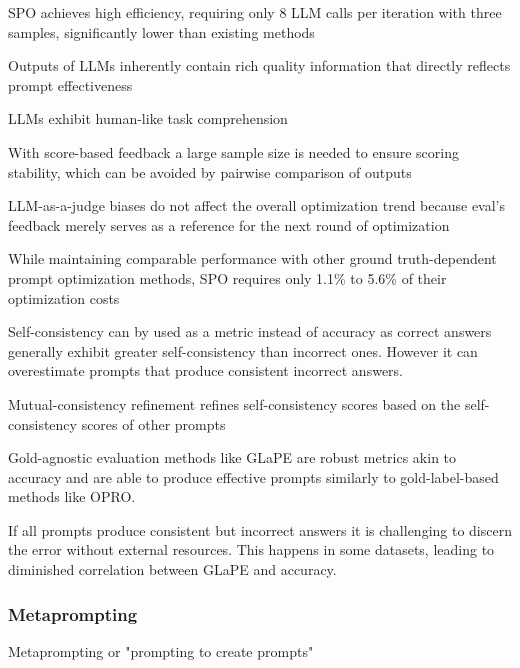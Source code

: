 SPO achieves high efficiency, requiring only 8 LLM calls per iteration with three samples, significantly lower than existing methods \cite{xiang2025selfsupervisedpromptoptimization}

Outputs of LLMs inherently contain rich quality information that directly reflects prompt effectiveness \cite{xiang2025selfsupervisedpromptoptimization}

LLMs exhibit human-like task comprehension \cite{xiang2025selfsupervisedpromptoptimization}

With score-based feedback a large sample size is needed to ensure scoring stability, which can be avoided by pairwise comparison of outputs \cite{xiang2025selfsupervisedpromptoptimization}

LLM-as-a-judge biases do not affect the overall optimization trend because eval’s feedback merely serves as a reference for the next round of optimization \cite{xiang2025selfsupervisedpromptoptimization}

While maintaining comparable performance with other ground truth-dependent prompt optimization methods, SPO requires only 1.1\% to 5.6\% of their optimization costs \cite{xiang2025selfsupervisedpromptoptimization}



Self-consistency can by used as a metric instead of accuracy as correct answers generally exhibit greater self-consistency than incorrect ones. However it can overestimate prompts that produce consistent incorrect answers. \cite{zhang2024glapegoldlabelagnosticprompt}

Mutual-consistency refinement refines self-consistency scores based on the self-consistency scores of other prompts \cite{zhang2024glapegoldlabelagnosticprompt}

Gold-agnostic evaluation methods like GLaPE are robust metrics akin to accuracy and are able to produce effective prompts similarly to gold-label-based methods like OPRO\cite{yang2024largelanguagemodelsoptimizers}. \cite{zhang2024glapegoldlabelagnosticprompt}

If all prompts produce consistent but incorrect answers it is challenging to discern the error without external resources. This happens in some datasets, leading to diminished correlation between GLaPE and accuracy. \cite{zhang2024glapegoldlabelagnosticprompt}


\subsubsection{Metaprompting}
Metaprompting or "prompting to create prompts"

